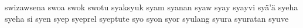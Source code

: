 swizawsena\hspace{2mm}
swoa\hspace{2mm}
swok\hspace{2mm}
swotu\hspace{2mm}
syaksyuk\hspace{2mm}
syam\hspace{2mm}
syanan\hspace{2mm}
syaw\hspace{2mm}
syay\hspace{2mm}
syayvi\hspace{2mm}
syä'ä\hspace{2mm}
syeha\hspace{2mm}
syeha si\hspace{2mm}
syen\hspace{2mm}
syep\hspace{2mm}
syeprel\hspace{2mm}
syeptute\hspace{2mm}
syo\hspace{2mm}
syon\hspace{2mm}
syor\hspace{2mm}
syulang\hspace{2mm}
syura\hspace{2mm}
syuratan\hspace{2mm}
syuve\hspace{2mm}
